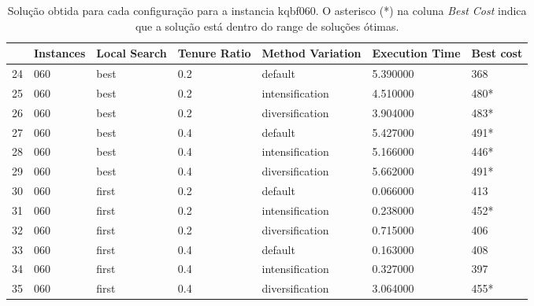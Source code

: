 \begin{table}
\centering
\begin{tabular}{lllllll}
\toprule
{} & Instances & Local Search & Tenure Ratio & Method Variation & Execution Time & Best cost \\
\midrule
24 &       060 &         best &          0.2 &          default &     5.390000 &       368 \\
25 &       060 &         best &          0.2 &  intensification &     4.510000 &       480* \\
26 &       060 &         best &          0.2 &  diversification &     3.904000 &       483* \\
27 &       060 &         best &          0.4 &          default &     5.427000 &       491* \\
28 &       060 &         best &          0.4 &  intensification &     5.166000 &       446* \\
29 &       060 &         best &          0.4 &  diversification &     5.662000 &       491* \\
30 &       060 &        first &          0.2 &          default &     0.066000 &       413 \\
31 &       060 &        first &          0.2 &  intensification &     0.238000 &       452* \\
32 &       060 &        first &          0.2 &  diversification &     0.715000 &       406 \\
33 &       060 &        first &          0.4 &          default &     0.163000 &       408 \\
34 &       060 &        first &          0.4 &  intensification &     0.327000 &       397 \\
35 &       060 &        first &          0.4 &  diversification &     3.064000 &       455* \\
\bottomrule
\end{tabular}
\caption{Solução obtida para cada configuração para a instancia kqbf060. O asterisco (*) na coluna \textit{Best Cost} indica que a solução está dentro do range de soluções ótimas.}
\label{table:all-data-2}
\end{table}

